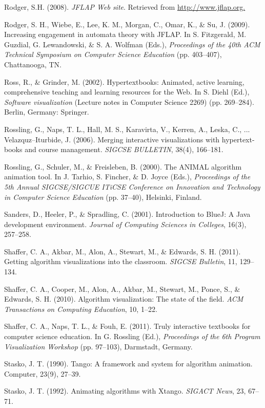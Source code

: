 \begin{chatext}
{Rodger, S.H. (2008). \textit{JFLAP Web site}. Retrieved from \url{http://www.jflap.org.}

Rodger, S. H., Wiebe, E., Lee, K. M., Morgan, C., Omar, K., \& Su, J. (2009). Increasing engagement in automata theory with JFLAP. In S. Fitzgerald, M. Guzdial, G. Lewandowski, \& S. A. Wolfman (Eds.), \textit{Proceedings of the 40th ACM Technical Symposium on Computer Science Education} (pp. 403–407), Chattanooga, TN.

Ross, R., \& Grinder, M. (2002). Hypertextbooks: Animated, active learning, comprehensive teaching and learning resources for the Web. In S. Diehl (Ed.), \textit{Software visualization} (Lecture notes in Computer Science 2269) (pp. 269–284). Berlin, Germany: Springer.

Rossling, G., Naps, T. L., Hall, M. S., Karavirta, V., Kerren, A., Leska, C., ... Velazquz–Iturbide, J. (2006). Merging interactive visualizations with hypertext-books and course management. \textit{SIGCSE BULLETIN}, 38(4), 166–181.

Rossling, G., Schuler, M., \& Freisleben, B. (2000). The ANIMAL algorithm animation tool. In J. Tarhio, S. Fincher, \& D. Joyce (Eds.), \textit{Proceedings of the 5th Annual SIGCSE/SIGCUE ITiCSE Conference on Innovation and Technology in Computer Science Education} (pp. 37–40), Helsinki, Finland.

Sanders, D., Heeler, P., \& Spradling, C. (2001). Introduction to BlueJ: A Java development environment. \textit{Journal of Computing Sciences in Colleges}, 16(3), 257–258.

Shaffer, C. A., Akbar, M., Alon, A., Stewart, M., \& Edwards, S. H. (2011). Getting algorithm visualizations into the classroom. \textit{SIGCSE Bulletin}, 11, 129–134.

Shaffer, C. A., Cooper, M., Alon, A., Akbar, M., Stewart, M., Ponce, S., \& Edwards, S. H. (2010). Algorithm visualization: The state of the field. \textit{ACM Transactions on Computing Education}, 10, 1–22.

Shaffer, C. A., Naps, T. L., \& Fouh, E. (2011). Truly interactive textbooks for computer science education. In G. Rossling (Ed.), \textit{Proceedings of the 6th Program Visualization Workshop} (pp. 97–103), Darmstadt, Germany.

Stasko, J. T. (1990). Tango: A framework and system for algorithm animation. Computer, 23(9), 27–39.

Stasko, J. T. (1992). Animating algorithms with Xtango. \textit{SIGACT News}, 23, 67–71.

}
\end{chatext}

